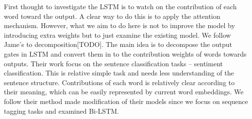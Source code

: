 \documentclass{article}
\begin{document}
First thought to investigate the LSTM is to watch on the contribution of each word toward the output. A clear way to do this is to apply the attention mechanism. However, what we aim to do here is not to improve the model by introducing extra weights but to just examine the existing model. We follow Jame’s to decomposition[TODO]. The main idea is to decompose the output gates in LSTM and convert them in to the contribution weights of words towards outputs. Their work focus on the sentence classification tasks -- sentiment classification. This is relative simple task and needs less understanding of the sentence structure. Contributions of each word is relatively clear according to their meaning, which can be easily represented by current word embeddings. We follow their method  made modification of their models since we focus on sequence tagging tasks and examined Bi-LSTM.


\end{document}
